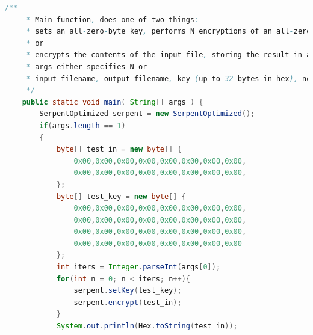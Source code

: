 \documentclass[12pt]{article} %
\begin{document}
\begin{lstlisting}[language=Java, basicstyle=\small, breaklines=true]
    /**
     * Main function, does one of two things:
     * sets an all-zero-byte key, performs N encryptions of an all-zero-byte plaintext block
     * or 
     * encrypts the contents of the input file, storing the result in an output file
     * args either specifies N or 
     * input filename, output filename, key (up to 32 bytes in hex), nonce (integer), and [e]ncrypt or [d]ecrypt
     */
    public static void main( String[] args ) {
        SerpentOptimized serpent = new SerpentOptimized();
        if(args.length == 1)
        {
            byte[] test_in = new byte[] {
                0x00,0x00,0x00,0x00,0x00,0x00,0x00,0x00,
                0x00,0x00,0x00,0x00,0x00,0x00,0x00,0x00,
            };
            byte[] test_key = new byte[] {
                0x00,0x00,0x00,0x00,0x00,0x00,0x00,0x00,
                0x00,0x00,0x00,0x00,0x00,0x00,0x00,0x00,
                0x00,0x00,0x00,0x00,0x00,0x00,0x00,0x00,
                0x00,0x00,0x00,0x00,0x00,0x00,0x00,0x00
            };
            int iters = Integer.parseInt(args[0]);
            for(int n = 0; n < iters; n++){
                serpent.setKey(test_key);
                serpent.encrypt(test_in);
            }
            System.out.println(Hex.toString(test_in));
            

\end{lstlisting}
\end{document}

